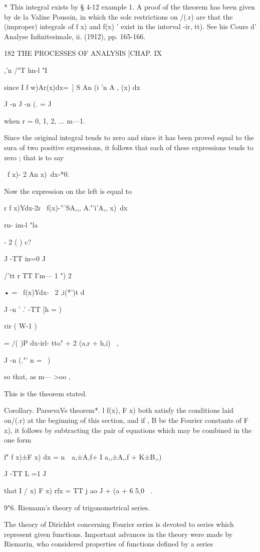 * This integral exists by § 4-12 example 1. A proof of the theorem has
been given by de la Valine Poussin, in which the sole restrictions on
/(.r) are that the (improper) integrals of f x) and f(x) ' exist in
the interval -ir, tt). See his Cours d' Analyse Infinitesimale, ii.
(1912), pp. 165-166.



182 THE PROCESSES OF ANALYSIS [CHAP. IX

,'n /"T hn-l "I

since I f w)Ar(x)dx=\ ] S An (i 'n A , (x) dx

J -n J -n (. = J

when r = 0, 1, 2, ... m—1.

Since the original integral tends to zero and since it has been proved
equal to the sura of two positive expressions, it follows that each of
these expressions tends to zero ; that is to say

\ f x)- 2 An x)\ dx-*0.

Now the expression on the left is equal to

r f x)Ydx-2r \ f(x)-'''SA,,, A.\'''i'A,, x)\ dx

rn- im-l "la

- 2 ( ) c?

J -TT in=0 J

/'tt r TT I'm— 1 ") 2

• = \ f(x)Ydx- \ 2 ,i(*')t d

J -n ' .' -TT [h = )

rir ( W-1 )

= /( )P dx-irl- tto" + 2 (a,r + h,i) \ ,

J -n (."' n = \ )

so that, as m— >oo ,

This is the theorem stated.

Corollary. ParsevaVs theorem*. l f(x), F x) both satisfy the
conditions laid on/(.r) at the beginning of this section, and if , B
be the Fourier constants of F x), it follows by subtracting the pair
of equations which may be combined in the one form

f" f x)±F x) dx = n\ \ a,±A,f+ I a,,±A,,f + K±B,,) \

J -TT L =1 J

that I / x) F x) rfx = TT j ao J + (a + 6 5,0 \ .

9"6. Riemann's theory of trigonometrical series.

The theory of Dirichlet concerning Fourier series is devoted to series
which represent given functions. Important advances in the theory were
made by Riemarin, who considered properties of functions defined by a
series

